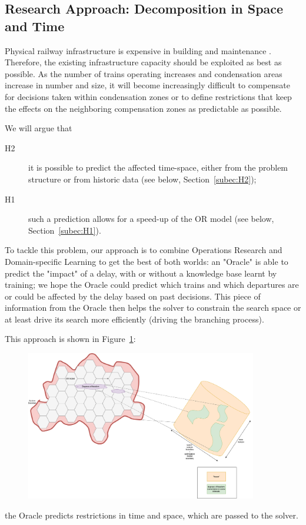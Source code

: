 \documentclass{article}
\begin{document}
\subsection{Research Approach: Decomposition in Space and Time}
Physical railway infrastructure is expensive in building and maintenance \cite{sr40programm}.
Therefore, the existing infrastructure capacity should be exploited as best as possible.
As the number of trains operating increases and condensation areas increase in number and size, it will become increasingly difficult to compensate for decisions taken within condensation zones or to define restrictions that keep the effects on the neighboring compensation zones as predictable as possible.

We will argue that
\begin{description}
\item [H2] it is possible to predict the affected time-space, either from the problem structure or from historic data (see below, Section~\ref{subec:H2});
\item [H1] such a prediction allows for a speed-up of the OR model (see below, Section~\ref{subec:H1}).
\end{description}



To tackle this problem, our approach is to combine Operations Research and Domain-specific Learning to get the best of both worlds: an "Oracle" is able to predict the "impact" of a delay, with or without a knowledge base learnt by training; we hope the Oracle could predict which trains and which departures are or could be affected by the delay based on past decisions. This piece of information from the Oracle then helps the solver to constrain the search space or at least drive its search more efficiently (driving the branching process).

This approach is shown in Figure~\ref{fig:introduction_time_space}:
%
\begin{figure}[ht]
	\centering
  \includegraphics[width=0.9\textwidth]{introduction_time_space.png}
	\caption{}
	\label{fig:introduction_time_space}
\end{figure}
the Oracle predicts restrictions in time and space, which are passed to the solver.
\end{document}
